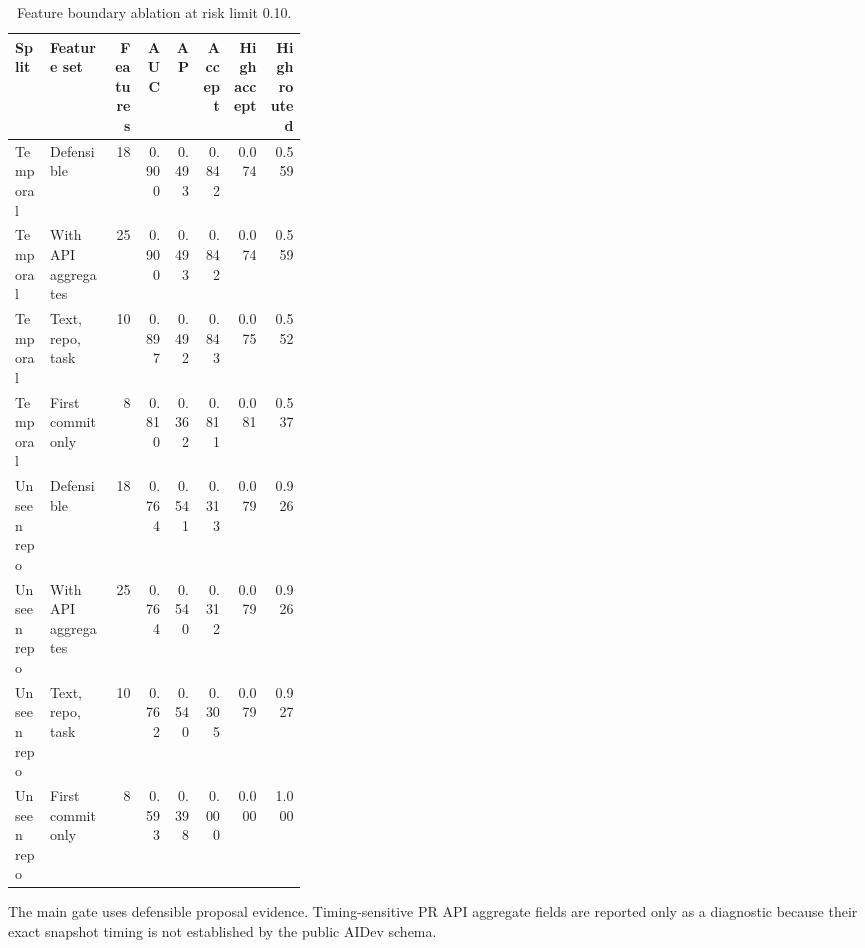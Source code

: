 \begin{table}[t]
\centering
\small
\caption{Feature boundary ablation at risk limit 0.10.}
\label{tab:aidev-feature-boundary}
\setlength{\tabcolsep}{1pt}
\begin{tabularx}{\linewidth}{p{0.12\linewidth}p{0.22\linewidth}rrrrrr}
\toprule
Split & Feature set & Features & AUC & AP & Accept & High accept & High routed \\
\midrule
Temporal & Defensible & 18 & 0.900 & 0.493 & 0.842 & 0.074 & 0.559 \\
Temporal & With API aggregates & 25 & 0.900 & 0.493 & 0.842 & 0.074 & 0.559 \\
Temporal & Text, repo, task & 10 & 0.897 & 0.492 & 0.843 & 0.075 & 0.552 \\
Temporal & First commit only & 8 & 0.810 & 0.362 & 0.811 & 0.081 & 0.537 \\
Unseen repo & Defensible & 18 & 0.764 & 0.541 & 0.313 & 0.079 & 0.926 \\
Unseen repo & With API aggregates & 25 & 0.764 & 0.540 & 0.312 & 0.079 & 0.926 \\
Unseen repo & Text, repo, task & 10 & 0.762 & 0.540 & 0.305 & 0.079 & 0.927 \\
Unseen repo & First commit only & 8 & 0.593 & 0.398 & 0.000 & 0.000 & 1.000 \\
\bottomrule
\end{tabularx}
\par\footnotesize{The main gate uses defensible proposal evidence. Timing-sensitive PR API aggregate fields are reported only as a diagnostic because their exact snapshot timing is not established by the public AIDev schema.}
\end{table}
